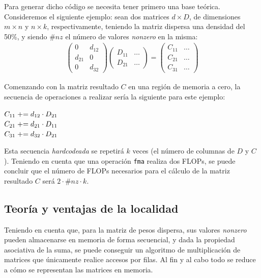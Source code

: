 Para generar dicho código se necesita tener primero una base teórica. Consideremos el siguiente ejemplo: sean dos matrices $d \times D$, de dimensiones $m \times n$ y $n \times k$, respectivamente, teniendo la matriz dispersa una densidad del 50\%, y siendo $\#nz$ el número de valores \textit{nonzero} en la misma:
\begin{gather}
    \begin{pmatrix}
        0 & d_{12}\\
        d_{21} & 0\\
        0 & d_{32}
    \end{pmatrix}	
    \begin{pmatrix}
        D_{11} & \dots\\
        D_{21} & \dots
    \end{pmatrix}
    =
    \begin{pmatrix}
        C_{11} & \dots\\
        C_{21} & \dots\\
        C_{31} & \dots
    \end{pmatrix} \nonumber %
\end{gather}

Comenzando con la matriz resultado $C$ en una región de memoria a cero, la secuencia de operaciones a realizar sería la siguiente para este ejemplo:
\begin{center}
    $C_{11} \mathrel{+}= d_{12} \cdot D_{21}$\\
    $C_{21} \mathrel{+}= d_{21} \cdot D_{11}$\\
    $C_{31} \mathrel{+}= d_{32} \cdot D_{21}$\\
\end{center}

Esta secuencia \textit{hardcodeada} se repetirá $k$ veces (el número de columnas de $D$ y $C$). Teniendo en cuenta que una operación \texttt{\acrshort{fma}} realiza dos FLOPs, se puede concluir que el número de FLOPs necesarios para el cálculo de la matriz resultado $C$ será $2 \cdot \#nz \cdot k$.

\subsection{Teoría y ventajas de la localidad}
\label{ssec:teoria_ventajas_localidad}
Teniendo en cuenta que, para la matriz de pesos dispersa, sus valores \textit{nonzero} pueden almacenarse en memoria de forma secuencial, y dada la propiedad asociativa de la suma, se puede conseguir un algoritmo de multiplicación de matrices que únicamente realice accesos por filas. Al fin y al cabo todo se reduce a cómo se representan las matrices en memoria.

